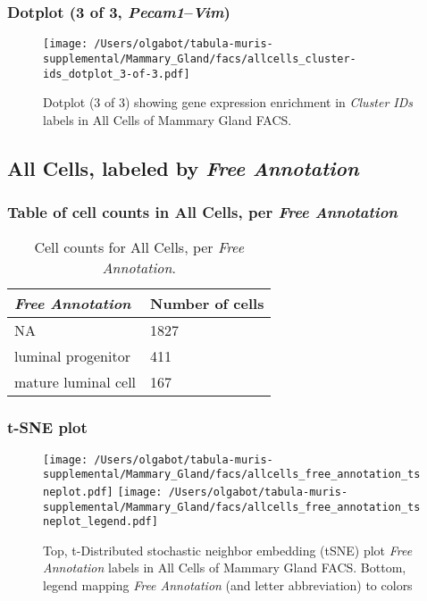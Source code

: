 \clearpage

\subsubsection{Dotplot (3 of 3, \emph{Pecam1}--\emph{Vim})}
\begin{figure}[h]
\centering
\texttt{[image: /Users/olgabot/tabula-muris-supplemental/Mammary\_Gland/facs/allcells\_cluster-ids\_dotplot\_3-of-3.pdf]}

\caption{ Dotplot (3 of 3)  showing gene expression enrichment in \emph{Cluster IDs} labels in All Cells of Mammary Gland FACS. }
\end{figure}


\clearpage

\subsection{All Cells, labeled by \emph{Free Annotation}}
\subsubsection{Table of cell counts in All Cells, per \emph{Free Annotation}}\begin{table}[h]
\centering
\label{my-label}
\begin{tabular}{@{}ll@{}}
\toprule

\emph{Free Annotation}& Number of cells \\ \midrule
NA & 1827 \\

luminal progenitor & 411 \\

mature luminal cell & 167 \\
\bottomrule
\end{tabular}
\caption{Cell counts for All Cells, per \emph{Free Annotation}.}
\end{table}

\clearpage
\subsubsection{t-SNE plot}
\begin{figure}[h]
\centering
\texttt{[image: /Users/olgabot/tabula-muris-supplemental/Mammary\_Gland/facs/allcells\_free\_annotation\_tsneplot.pdf]}
\texttt{[image: /Users/olgabot/tabula-muris-supplemental/Mammary\_Gland/facs/allcells\_free\_annotation\_tsneplot\_legend.pdf]}
\caption{Top, t-Distributed stochastic neighbor embedding (tSNE) plot  \emph{Free Annotation} labels in All Cells of Mammary Gland FACS. Bottom, legend mapping \emph{Free Annotation} (and letter abbreviation) to colors}
\end{figure}


